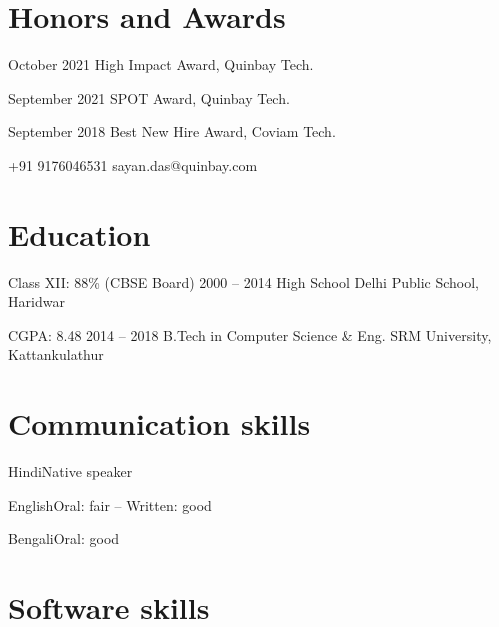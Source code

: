 \documentclass{tccv}
\makeatletter
\newcommand{\at}{\makeatletter @\makeatother}
\makeatother
\begin{document}
\section{Honors and Awards}

\begin{eventlist}
	
	\item{October 2021}
	{High Impact Award, Quinbay Tech.}
	{}
	
	
	
	\item{September 2021}
	{SPOT Award, Quinbay Tech.}
	{}
	
	\item{September 2018}
	{Best New Hire Award, Coviam Tech.}
	{}
	
	
\end{eventlist}

{+91 9176046531}
{sayan.das\at quinbay.com}

\section{Education}

\begin{yearlist}
	
	\item[Class XII: 88\% (CBSE Board)]{2000 -- 2014}
	{High School}
	{Delhi Public School, Haridwar}
	
	\item[CGPA: 8.48]{2014 -- 2018}
	{B.Tech in Computer Science \& Eng.}
	{SRM University, Kattankulathur}
	
\end{yearlist}


\section{Communication skills}

\begin{factlist}
	\item{Hindi}{Native speaker}
	\item{English}{Oral: fair -- Written: good}
	\item{Bengali}{Oral: good}
\end{factlist}

\section{Software skills}
\end{document}
